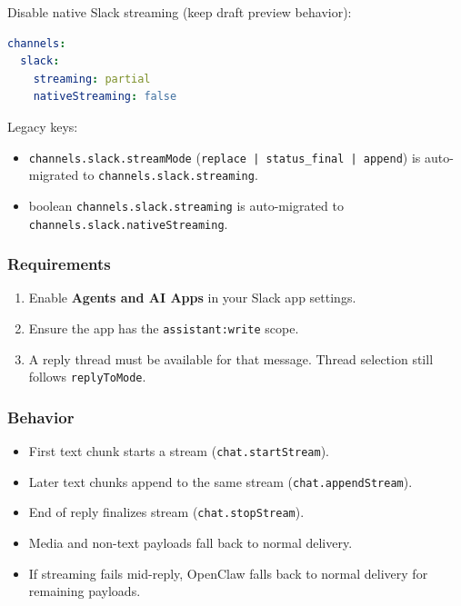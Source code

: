 Disable native Slack streaming (keep draft preview behavior):

\begin{lstlisting}[language=yaml]
channels:
  slack:
    streaming: partial
    nativeStreaming: false
\end{lstlisting}


Legacy keys:

\begin{itemize}
  \item \texttt{channels.slack.streamMode} (\texttt{replace | status\_final | append}) is auto-migrated to \texttt{channels.slack.streaming}.
  \item boolean \texttt{channels.slack.streaming} is auto-migrated to \texttt{channels.slack.nativeStreaming}.
\end{itemize}


\subsubsection{Requirements}


\begin{enumerate}
  \item Enable \textbf{Agents and AI Apps} in your Slack app settings.
  \item Ensure the app has the \texttt{assistant:write} scope.
  \item A reply thread must be available for that message. Thread selection still follows \texttt{replyToMode}.
\end{enumerate}


\subsubsection{Behavior}


\begin{itemize}
  \item First text chunk starts a stream (\texttt{chat.startStream}).
  \item Later text chunks append to the same stream (\texttt{chat.appendStream}).
  \item End of reply finalizes stream (\texttt{chat.stopStream}).
  \item Media and non-text payloads fall back to normal delivery.
  \item If streaming fails mid-reply, OpenClaw falls back to normal delivery for remaining payloads.
\end{itemize}


